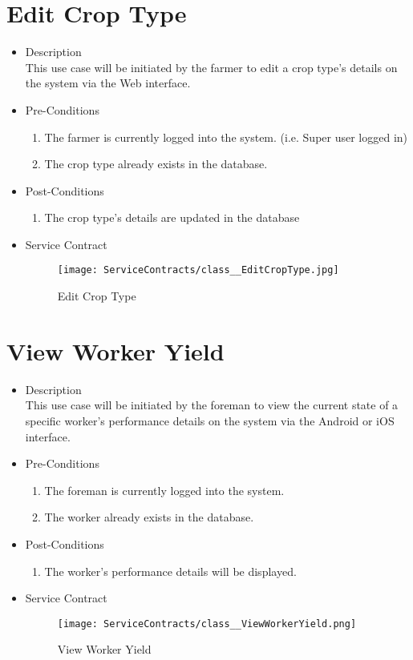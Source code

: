 \documentclass[11pt,fleqn]{book} %
\begin{document}
\section{Edit Crop Type}
\begin{itemize}
	\item Description\\
	This use case will be initiated by the farmer to edit a crop type’s details on the system via the Web interface.
	\item Pre-Conditions
	\begin{enumerate}
		\item The farmer is currently logged into the system. (i.e. Super user logged in)
		\item The crop type already exists in the database.					
	\end{enumerate}
	\item Post-Conditions
	\begin{enumerate}
		\item The crop type’s details are updated in the database
	\end{enumerate}
	\item Service Contract
	\begin{figure}
		\texttt{[image: ServiceContracts/class\_\_EditCropType.jpg]}
		\caption{Edit Crop Type}
	\end{figure}
\end{itemize}

\section{View Worker Yield}
\begin{itemize}
	\item Description\\
	This use case will be initiated by the foreman to view the current state of a specific worker’s performance details on the system via the Android or iOS interface.
	\item Pre-Conditions
	\begin{enumerate}
		\item The foreman is currently logged into the system.
		\item The worker already exists in the database.				 
	\end{enumerate}
	\item Post-Conditions
	\begin{enumerate}
		\item The worker’s performance details will be displayed.
	\end{enumerate}
	\item Service Contract
	\begin{figure}
		\texttt{[image: ServiceContracts/class\_\_ViewWorkerYield.png]}
		\caption{View Worker Yield}
	\end{figure}
\end{itemize}
\end{document}

